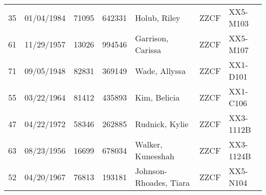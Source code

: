\documentclass[]{article}
\begin{document}
\begin{tabular}{cccclll}
   35 & 01/04/1984 & 71095 & 642331 & Holub, Riley & ZZCF & XX5-M103 \\ 
   61 & 11/29/1957 & 13026 & 994546 & Garrison, Carissa & ZZCF & XX5-M107 \\ 
   71 & 09/05/1948 & 82831 & 369149 & Wade, Allyssa & ZZCF & XX1-D101 \\ 
   55 & 03/22/1964 & 81412 & 435893 & Kim, Belicia & ZZCF & XX1-C106 \\ 
   47 & 04/22/1972 & 58346 & 262885 & Rudnick, Kylie & ZZCF & XX3-1112B \\ 
   63 & 08/23/1956 & 16699 & 678034 & Walker, Kuneeshah & ZZCF & XX3-1124B \\ 
   52 & 04/20/1967 & 76813 & 193181 & Johnson-Rhoades, Tiara & ZZCF & XX5-N104 \\ 
  \end{tabular}
\end{document}
